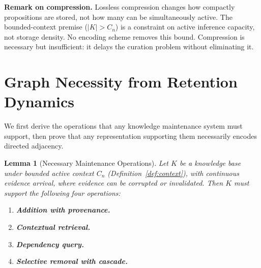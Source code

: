 \documentclass[11pt]{article}
\newtheorem{lemma}[theorem]{Lemma}
\theoremstyle{definition}
\begin{document}
\textbf{Remark on compression.} Lossless compression changes how
compactly propositions are stored, not how many can be simultaneously
active. The bounded-context premise ($|K| > C_n$) is a constraint on
active inference capacity, not storage density. No encoding scheme removes this bound. Compression is necessary
but insufficient: it delays the curation problem without eliminating
it.

\section{Graph Necessity from Retention Dynamics}
\label{sec:dynamics}

We first derive the operations that any knowledge maintenance system
must support, then prove that any representation supporting them
necessarily encodes directed adjacency.

\begin{lemma}[Necessary Maintenance Operations]
\label{lem:ops}
Let $K$ be a knowledge base under bounded active context $C_n$
(Definition~\ref{def:context}), with continuous evidence arrival, where
evidence can be corrupted or invalidated. Then $K$ must support the
following four operations:
\begin{enumerate}
\item[(i)] \textbf{Addition with provenance.}
\item[(ii)] \textbf{Contextual retrieval.}
\item[(iii)] \textbf{Dependency query.}
\item[(iv)] \textbf{Selective removal with cascade.}
\end{enumerate}
\end{lemma}
\end{document}
